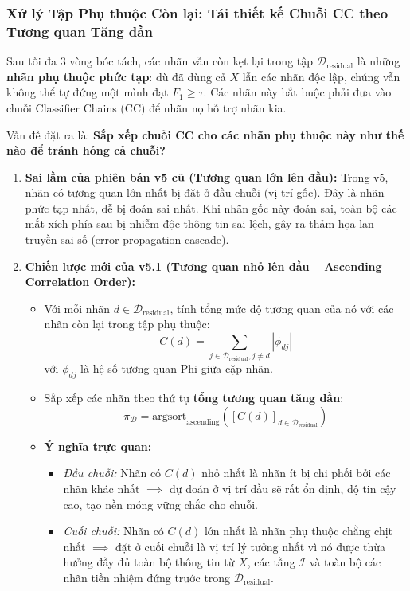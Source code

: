 \documentclass[11pt,a4paper]{article}
\begin{document}
\subsubsection{Xử lý Tập Phụ thuộc Còn lại: Tái thiết kế Chuỗi CC theo Tương quan Tăng dần}
\label{subsubsec:ascending_cc}

Sau tối đa 3 vòng bóc tách, các nhãn vẫn còn kẹt lại trong tập $\mathcal{D}_{\text{residual}}$ là những \textbf{nhãn phụ thuộc phức tạp}: dù đã dùng cả $X$ lẫn các nhãn độc lập, chúng vẫn không thể tự đứng một mình đạt $F_1 \ge \tau$. Các nhãn này bắt buộc phải đưa vào chuỗi Classifier Chains (CC) để nhãn nọ hỗ trợ nhãn kia.

Vấn đề đặt ra là: \textbf{Sắp xếp chuỗi CC cho các nhãn phụ thuộc này như thế nào để tránh hỏng cả chuỗi?}

\begin{enumerate}
    \item \textbf{Sai lầm của phiên bản v5 cũ (Tương quan lớn lên đầu):}
    Trong v5, nhãn có tương quan lớn nhất bị đặt ở đầu chuỗi (vị trí gốc). Đây là nhãn phức tạp nhất, dễ bị đoán sai nhất. Khi nhãn gốc này đoán sai, toàn bộ các mắt xích phía sau bị nhiễm độc thông tin sai lệch, gây ra thảm họa lan truyền sai số (error propagation cascade).
    
    \item \textbf{Chiến lược mới của v5.1 (Tương quan nhỏ lên đầu -- Ascending Correlation Order):}
    \begin{itemize}
        \item Với mỗi nhãn $d \in \mathcal{D}_{\text{residual}}$, tính tổng mức độ tương quan của nó với các nhãn còn lại trong tập phụ thuộc:
        \begin{equation}
        C(d) = \sum_{j \in \mathcal{D}_{\text{residual}}, j \neq d} |\phi_{dj}|
        \end{equation}
        với $\phi_{dj}$ là hệ số tương quan Phi giữa cặp nhãn.
        \item Sắp xếp các nhãn theo thứ tự \textbf{tổng tương quan tăng dần}:
        \begin{equation}
        \pi_{\mathcal{D}} = \text{argsort}_{\text{ascending}}\left( [C(d)]_{d \in \mathcal{D}_{\text{residual}}} \right)
        \label{eq:ascending_order}
        \end{equation}
        \item \textbf{Ý nghĩa trực quan:}
        \begin{itemize}
            \item \textit{Đầu chuỗi:} Nhãn có $C(d)$ nhỏ nhất là nhãn ít bị chi phối bởi các nhãn khác nhất $\implies$ dự đoán ở vị trí đầu sẽ rất ổn định, độ tin cậy cao, tạo nền móng vững chắc cho chuỗi.
            \item \textit{Cuối chuỗi:} Nhãn có $C(d)$ lớn nhất là nhãn phụ thuộc chằng chịt nhất $\implies$ đặt ở cuối chuỗi là vị trí lý tưởng nhất vì nó được thừa hưởng đầy đủ toàn bộ thông tin từ $X$, các tầng $\mathcal{I}$ và toàn bộ các nhãn tiền nhiệm đứng trước trong $\mathcal{D}_{\text{residual}}$.
        \end{itemize}
    \end{itemize}
\end{enumerate}
\end{document}
